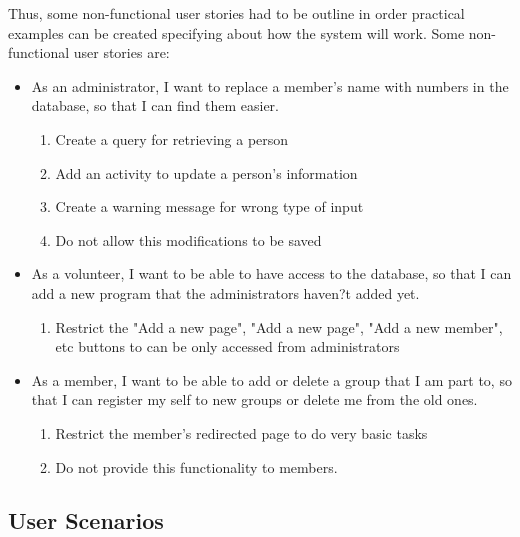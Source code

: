 \documentclass{l3proj}
\begin{document}
Thus, some non-functional user stories had to be outline in order practical examples can be created specifying about how the system will work. Some non-functional user stories are:

\begin{itemize}

\item  As an administrator, I want to replace a member's name with numbers in the database, so that I can find them easier.

	\begin{enumerate}
	
	\item Create a query for retrieving a person
	
	\item Add an activity to update a person's information
	
	\item Create a warning message for wrong type of input
	
	\item Do not allow this modifications to be saved
	\end{enumerate}
	
\item As a volunteer, I want to be able to have access to the database, so that I can add a new program that the administrators haven?t added yet.

	\begin{enumerate}
	\item Restrict the "Add a new page", "Add a new page", "Add a new member", etc buttons to can be only accessed from administrators
	\end{enumerate}
	
\item As a member, I want to be able to add or delete a group that I am part to, so that I can register my self to new groups or delete me from the old ones.

	\begin{enumerate}
	\item Restrict the member's redirected page to do very basic tasks
	\item Do not provide this functionality to members.
	\end{enumerate}

\end{itemize}

\subsection{User Scenarios}
\label{user_scenarios}
\end{document}
